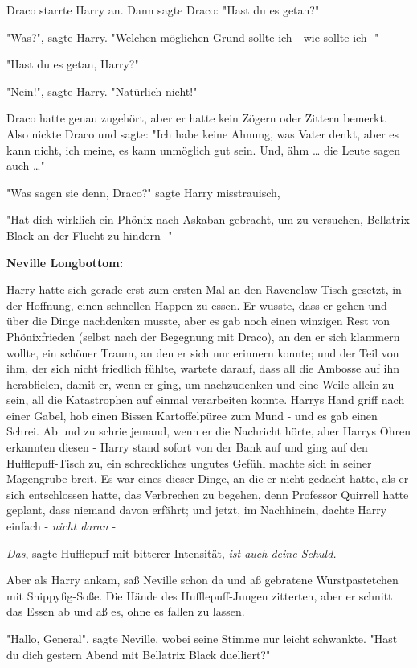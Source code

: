 {Draco starrte Harry an. Dann sagte Draco: "Hast du es getan?"

"Was?", sagte Harry. "Welchen möglichen Grund sollte ich - wie sollte ich -"

"Hast du es getan, Harry?"

"Nein!", sagte Harry. "Natürlich nicht!"

Draco hatte genau zugehört, aber er hatte kein Zögern oder Zittern bemerkt. Also nickte Draco und sagte: "Ich habe keine Ahnung, was Vater denkt, aber es kann nicht, ich meine, es kann unmöglich gut sein. Und, ähm … die Leute sagen auch …"

"Was sagen sie denn, Draco?" sagte Harry misstrauisch,

"Hat dich wirklich ein Phönix nach Askaban gebracht, um zu versuchen, Bellatrix Black an der Flucht zu hindern -"

\textbf{Neville Longbottom:}

Harry hatte sich gerade erst zum ersten Mal an den Ravenclaw-Tisch gesetzt, in der Hoffnung, einen schnellen Happen zu essen. Er wusste, dass er gehen und über die Dinge nachdenken musste, aber es gab noch einen winzigen Rest von Phönixfrieden (selbst nach der Begegnung mit Draco), an den er sich klammern wollte, ein schöner Traum, an den er sich nur erinnern konnte; und der Teil von ihm, der sich nicht friedlich fühlte, wartete darauf, dass all die Ambosse auf ihn herabfielen, damit er, wenn er ging, um nachzudenken und eine Weile allein zu sein, all die Katastrophen auf einmal verarbeiten konnte. Harrys Hand griff nach einer Gabel, hob einen Bissen Kartoffelpüree zum Mund - und es gab einen Schrei. Ab und zu schrie jemand, wenn er die Nachricht hörte, aber Harrys Ohren erkannten diesen - Harry stand sofort von der Bank auf und ging auf den Hufflepuff-Tisch zu, ein schreckliches ungutes Gefühl machte sich in seiner Magengrube breit. Es war eines dieser Dinge, an die er nicht gedacht hatte, als er sich entschlossen hatte, das Verbrechen zu begehen, denn Professor Quirrell hatte geplant, dass niemand davon erfährt; und jetzt, im Nachhinein, dachte Harry einfach - \emph{nicht daran} -

\emph{Das}, sagte Hufflepuff mit bitterer Intensität, \emph{ist auch deine Schuld.}

Aber als Harry ankam, saß Neville schon da und aß gebratene Wurstpastetchen mit Snippyfig-Soße. Die Hände des Hufflepuff-Jungen zitterten, aber er schnitt das Essen ab und aß es, ohne es fallen zu lassen.

"Hallo, General", sagte Neville, wobei seine Stimme nur leicht schwankte. "Hast du dich gestern Abend mit Bellatrix Black duelliert?"

}
